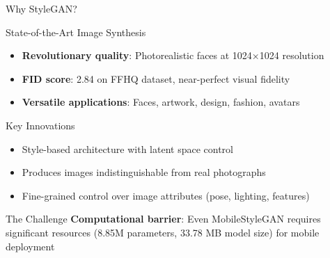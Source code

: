 \documentclass[aspectratio=169,xcolor=dvipsnames]{beamer}
\begin{document}
\begin{frame}{Why StyleGAN?}
    \begin{block}{State-of-the-Art Image Synthesis}
        \begin{itemize}
            \item \textbf{Revolutionary quality}: Photorealistic faces at 1024×1024 resolution
            \item \textbf{FID score}: 2.84 on FFHQ dataset, near-perfect visual fidelity
            \item \textbf{Versatile applications}: Faces, artwork, design, fashion, avatars
        \end{itemize}
    \end{block}
    
    \begin{block}{Key Innovations}
        \begin{itemize}
            \item Style-based architecture with latent space control
            \item Produces images indistinguishable from real photographs
            \item Fine-grained control over image attributes (pose, lighting, features)
        \end{itemize}
    \end{block}
    
    \begin{alertblock}{The Challenge}
        \textbf{Computational barrier}: Even MobileStyleGAN requires significant resources (8.85M parameters, 33.78 MB model size) for mobile deployment
    \end{alertblock}
\end{frame}
\end{document}
